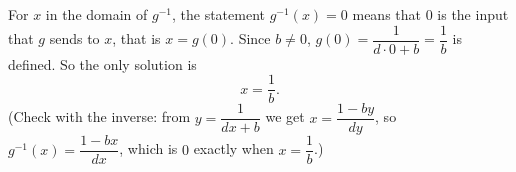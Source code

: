 For $x$ in the domain of $g^{-1}$, the statement $g^{-1}(x)=0$ means that $0$ is the input that $g$ sends to $x$, that is $x=g(0)$. Since $b\ne0$, $g(0)=\dfrac{1}{d\cdot0+b}=\dfrac{1}{b}$ is defined. So the only solution is
\[
x=\boxed{\dfrac{1}{b}}.
\]
(Check with the inverse: from $y=\dfrac{1}{dx+b}$ we get $x=\dfrac{1-by}{dy}$, so $g^{-1}(x)=\dfrac{1-bx}{dx}$, which is $0$ exactly when $x=\dfrac{1}{b}$.)
